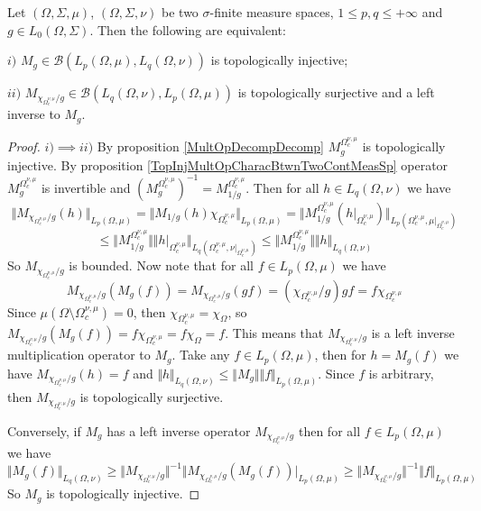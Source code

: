 \begin{proposition}\label{TopInjMultOpDescBtwnTwoMeasSp} Let $(\Omega,\Sigma,\mu)$, $(\Omega,\Sigma,\nu)$ be two $\sigma$-finite measure spaces, $1\leq p,q\leq +\infty$ and $g\in L_0(\Omega,\Sigma)$. Then the following are equivalent:

$i)$ $M_g\in\mathcal{B}(L_p(\Omega,\mu),L_q(\Omega,\nu))$ is topologically injective;

$ii)$ $M_{\chi_{\Omega_c^{\nu,\mu}}/g}\in\mathcal{B}(L_q(\Omega,\nu), L_p(\Omega,\mu))$ is topologically surjective and a left inverse to $M_g$.
\end{proposition}
\begin{proof}
$i)$$\implies$$ ii)$ By proposition \ref{MultOpDecompDecomp}  $M_g^{\Omega_c^{\nu,\mu}}$ is topologically injective. By proposition \ref{TopInjMultOpCharacBtwnTwoContMeasSp} operator $M_g^{\Omega_c^{\nu,\mu}}$ is invertible and $(M_g^{\Omega_c^{\nu,\mu}})^{-1}=M_{1/g}^{\Omega_c^{\nu,\mu}}$. Then for all $h\in L_q(\Omega,\nu)$ we have
$$
\Vert M_{\chi_{\Omega_c^{\nu,\mu}}/g}(h)\Vert_{L_p(\Omega,\mu)}=
\Vert M_{1/g}(h)\chi_{\Omega_c^{\nu,\mu}}\Vert_{L_p(\Omega,\mu)}=
\Vert M_{1/g}^{\Omega_c^{\nu,\mu}}(h|_{\Omega_c^{\nu,\mu}})\Vert_{L_p(\Omega_c^{\nu,\mu},\mu|_{\Omega_c^{\nu,\mu}})}
$$
$$
\leq\Vert M_{1/g}^{\Omega_c^{\nu,\mu}}\Vert\Vert h|_{\Omega_c^{\nu,\mu}}\Vert_{L_q(\Omega_c^{\nu,\mu},\nu|_{\Omega_c^{\nu,\mu}})}
\leq\Vert M_{1/g}^{\Omega_c^{\nu,\mu}}\Vert\Vert h\Vert_{L_q(\Omega,\nu)}
$$ 
So $M_{\chi_{\Omega_c^{\nu,\mu}}/g}$ is bounded. Now note that for all $f\in L_p(\Omega,\mu)$ we have 
$$
M_{\chi_{\Omega_c^{\nu,\mu}}/g}(M_g(f))
=M_{\chi_{\Omega_c^{\nu,\mu}}/g}(g  f)
=(\chi_{\Omega_c^{\nu,\mu}}/g)  g  f
=f \chi_{\Omega_c^{\nu,\mu}}
$$
Since $\mu(\Omega\setminus\Omega_c^{\nu,\mu})=0$, then $\chi_{\Omega_c^{\nu,\mu}}=\chi_{\Omega}$, so $M_{\chi_{\Omega_c^{\nu,\mu}}/g}(M_g(f))=f \chi_{\Omega_c^{\nu,\mu}}=f \chi_{\Omega}=f$. This means that $M_{\chi_{\Omega_c^{\nu,\mu}}/g}$ is a left inverse multiplication operator to $M_g$. Take any $f\in L_p(\Omega,\mu)$, then for $h=M_g(f)$ we have $M_{\chi_{\Omega_c^{\nu,\mu}}/g}(h)=f$ and $\Vert h\Vert_{L_q(\Omega,\nu)}\leq\Vert M_g\Vert\Vert f\Vert_{L_p(\Omega,\mu)}$. Since $f$ is arbitrary, then $M_{\chi_{\Omega_c^{\nu,\mu}}/g}$ is topologically surjective.

Conversely, if $M_g$ has a left inverse operator $M_{\chi_{\Omega_c^{\nu,\mu}}/g}$ then for all $f\in L_p(\Omega,\mu)$ we have 
$$
\Vert M_g(f)\Vert_{L_q(\Omega,\nu)}
\geq\Vert M_{\chi_{\Omega_c^{\nu,\mu}}/g}\Vert^{-1}\Vert M_{\chi_{\Omega_c^{\nu,\mu}}/g}(M_g(f))\vert_{L_p(\Omega,\mu)}
\geq\Vert M_{\chi_{\Omega_c^{\nu,\mu}}/g}\Vert^{-1}\Vert f\Vert_{L_p(\Omega,\mu)}
$$
So $M_g$ is topologically injective.
\end{proof}


